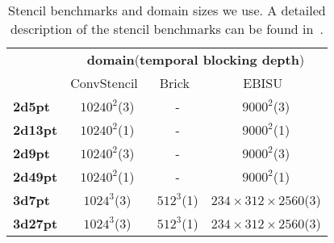 

\begin{table}[t]
    \vspace{-8pt}
    \centering
    \caption{\label{tab:stencilbench}Stencil benchmarks and domain sizes we use. A detailed description of the stencil benchmarks can be found in~\cite{zhao2019exploiting,rawat2016effective}.%
    }
    \vspace{-10pt}
    {%
    \footnotesize
\begin{tabular}{l| c c c}
\toprule
\multirow{2}{*}{}&\multicolumn{3}{c}{\textbf{domain}(\textbf{temporal blocking depth})} \\
\cmidrule(r){2-4} 
        & ConvStencil~\cite{10.1145/3627535.3638476} & Brick~\cite{zhao2019exploiting} & EBISU~\cite{10.1145/3577193.3593716}  \\
\midrule
\textbf{2d5pt}   & $10240^2$(3) &  -       & $9000^2$(3)  \\
\textbf{2d13pt}  & $10240^2$(1)   &   -      &  $9000^2$(1)    \\
\textbf{2d9pt}   & $10240^2$(3) &    -     &  $9000^2$(3) \\
\textbf{2d49pt}  & $10240^2$(1)   &     -    &  $9000^2$(1)    \\
\textbf{3d7pt}   & $1024^3$(3)   & $512^3$(1)   & $234\times312\times2560$(3)     \\
\textbf{3d27pt}  & $1024^3$(3)  & $512^3$(1)   & $234\times312\times2560$(3)     \\
\bottomrule
    \end{tabular}

    }
    \label{tab:domain}
\end{table}

